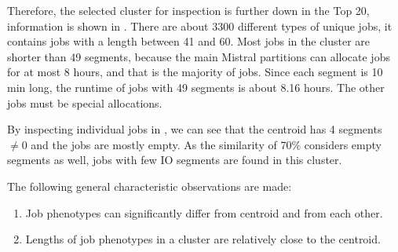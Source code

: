 \documentclass{jhps}
\makeatletter
\newcommand{\jk}[1]{\todo[inline]{JK:\@#1}}
\makeatother
\begin{document}
Therefore, the selected cluster for inspection is further down in the Top 20, information is shown in .
\jk{War es top 20?}
There are about 3300 different types of unique jobs, it contains jobs with a length between 41 and 60.
Most jobs in the cluster are shorter than 49 segments, because the main Mistral partitions can allocate jobs for at most 8 hours, and that is the majority of jobs.
Since each segment is 10 min long, the runtime of jobs with 49 segments is about 8.16 hours.
The other jobs must be special allocations.

By inspecting individual jobs in , we can see that the centroid has 4 segments $\neq 0$ and the jobs are mostly empty.
As the similarity of 70\% considers empty segments as well, jobs with few IO segments are found in this cluster.

The following general characteristic observations are made:
\begin{enumerate}
 \item Job phenotypes can significantly differ from centroid and from each other.
 \item Lengths of job phenotypes in a cluster are relatively close to the centroid.
\end{enumerate}
\end{document}
